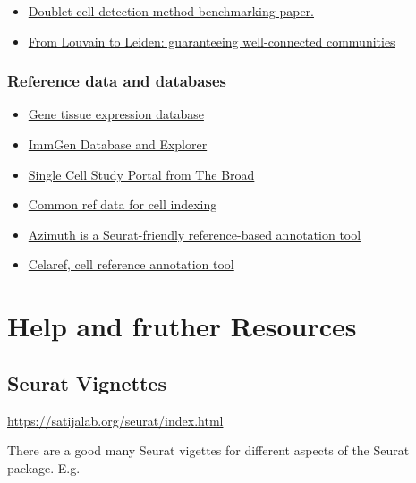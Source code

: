 \documentclass[
]{book}
\providecommand{\tightlist}{%
  \setlength{\itemsep}{0pt}\setlength{\parskip}{0pt}}
\begin{document}
\begin{itemize}
\tightlist
\item
  \href{https://www.cell.com/cell-systems/fulltext/S2405-4712(20)30459-2}{Doublet cell detection method benchmarking paper.}
\item
  \href{https://www.nature.com/articles/s41598-019-41695-z}{From Louvain to Leiden: guaranteeing well-connected communities}
\end{itemize}

\subsubsection{Reference data and databases}\label{reference-data-and-databases}

\begin{itemize}
\tightlist
\item
  \href{https://gtexportal.org/home/}{Gene tissue expression database}
\item
  \href{https://www.immgen.org/Databrowser19/DatabrowserPage.html}{ImmGen Database and Explorer}
\item
  \href{https://singlecell.broadinstitute.org/single_cell}{Single Cell Study Portal from The Broad}
\item
  \href{http://bioconductor.org/packages/release/data/experiment/vignettes/celldex/inst/doc/userguide.html\#2_General-purpose_references}{Common ref data for cell indexing}
\item
  \href{https://azimuth.hubmapconsortium.org/references/\#Human\%20-\%20PBMC}{Azimuth is a Seurat-friendly reference-based annotation tool}
\item
  \href{https://www.bioconductor.org/packages/release/bioc/html/celaref.html}{Celaref, cell reference annotation tool}
\end{itemize}

\section{Help and fruther Resources}\label{help-and-fruther-resources}

\subsection*{Seurat Vignettes}\label{seurat-vignettes}

\url{https://satijalab.org/seurat/index.html}

There are a good many Seurat vigettes for different aspects of the Seurat package. E.g.
\end{document}
